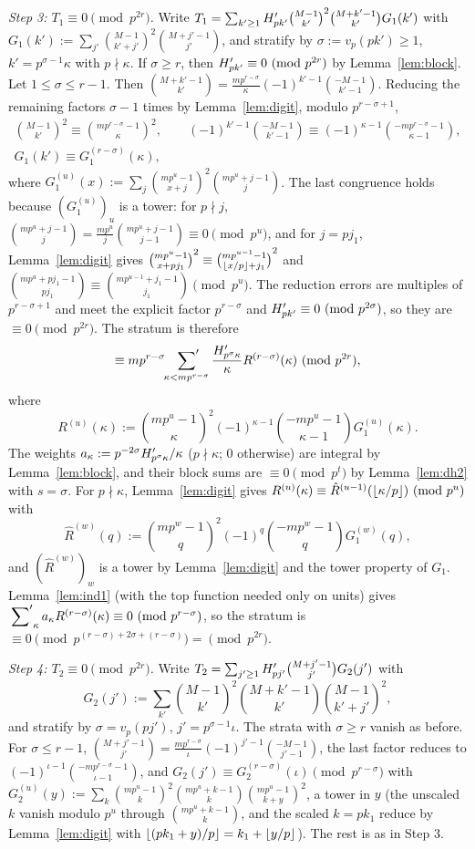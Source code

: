 \documentclass[11pt]{amsart}
\begin{document}
\emph{Step 3: $T_1\equiv0\pmod{p^{2r}}$.} Write $T_1=\sum_{k'\ge1}H'_{pk'}\binom{M-1}{k'}^2\binom{M+k'-1}{k'}G_1(k')$ with $G_1(k'):=\sum_{j'}\binom{M-1}{k'+j'}^2\binom{M+j'-1}{j'}$, and stratify by $\sigma:=v_p(pk')\ge1$, $k'=p^{\sigma-1}\kappa$ with $p\nmid\kappa$. If $\sigma\ge r$, then $H'_{pk'}\equiv0\ (\mathrm{mod}\ p^{2r})$ by Lemma~\ref{lem:block}. Let $1\le\sigma\le r-1$. Then $\binom{M+k'-1}{k'}=\frac{mp^{r-\sigma}}\kappa(-1)^{k'-1}\binom{-M-1}{k'-1}$. Reducing the remaining factors $\sigma-1$ times by Lemma~\ref{lem:digit}, modulo $p^{r-\sigma+1}$,
\begin{gather*} \binom{M-1}{k'}^2\equiv\binom{mp^{r-\sigma}-1}\kappa^2,\qquad(-1)^{k'-1}\binom{-M-1}{k'-1}\equiv(-1)^{\kappa-1}\binom{-mp^{r-\sigma}-1}{\kappa-1},\\ G_1(k')\equiv G_1^{(r-\sigma)}(\kappa), \end{gather*}
where $G_1^{(u)}(x):=\sum_j\binom{mp^u-1}{x+j}^2\binom{mp^u+j-1}j$. The last congruence holds because $(G_1^{(u)})_u$ is a tower: for $p\nmid j$, $\binom{mp^u+j-1}j=\frac{mp^u}j\binom{mp^u+j-1}{j-1}\equiv0\pmod{p^u}$, and for $j=pj_1$, Lemma~\ref{lem:digit} gives $\binom{mp^u-1}{x+pj_1}^2\equiv\binom{mp^{u-1}-1}{\left\lfloor x/p\right\rfloor+j_1}^2$ and $\binom{mp^u+pj_1-1}{pj_1}\equiv\binom{mp^{u-1}+j_1-1}{j_1}\pmod{p^u}$. The reduction errors are multiples of $p^{r-\sigma+1}$ and meet the explicit factor $p^{r-\sigma}$ and $H'_{pk'}\equiv0\ (\mathrm{mod}\ p^{2\sigma})$, so they are $\equiv0\pmod{p^{2r}}$. The stratum is therefore
\[ \equiv mp^{r-\sigma}\sideset{}{'}\sum_{\kappa<mp^{r-\sigma}}\frac{H'_{p^\sigma\kappa}}\kappa R^{(r-\sigma)}(\kappa)\ (\mathrm{mod}\ p^{2r}), \]
where
\[ R^{(u)}(\kappa):=\binom{mp^u-1}\kappa^2(-1)^{\kappa-1}\binom{-mp^u-1}{\kappa-1}G_1^{(u)}(\kappa). \]
The weights $a_\kappa:=p^{-2\sigma}H'_{p^\sigma\kappa}/\kappa$ ($p\nmid\kappa$; $0$ otherwise) are integral by Lemma~\ref{lem:block}, and their block sums are $\equiv0\pmod{p^t}$ by Lemma~\ref{lem:dh2} with $s=\sigma$. For $p\nmid\kappa$, Lemma~\ref{lem:digit} gives $R^{(u)}(\kappa)\equiv\hat R^{(u-1)}(\left\lfloor \kappa/p\right\rfloor)\ (\mathrm{mod}\ p^u)$ with
\[ \hat R^{(w)}(q):=\binom{mp^w-1}q^2(-1)^q\binom{-mp^w-1}qG_1^{(w)}(q), \]
and $(\hat R^{(w)})_w$ is a tower by Lemma~\ref{lem:digit} and the tower property of $G_1$. Lemma~\ref{lem:ind1} (with the top function needed only on units) gives $\sideset{}{'}\sum_\kappa a_\kappa R^{(r-\sigma)}(\kappa)\equiv0\ (\mathrm{mod}\ p^{r-\sigma})$, so the stratum is $\equiv0\pmod{p^{(r-\sigma)+2\sigma+(r-\sigma)}}=\pmod{p^{2r}}$.

\emph{Step 4: $T_2\equiv0\pmod{p^{2r}}$.} Write $T_2=\sum_{j'\ge1}H'_{pj'}\binom{M+j'-1}{j'}G_2(j')$ with
\[ G_2(j'):=\sum_{k'}\binom{M-1}{k'}^2\binom{M+k'-1}{k'}\binom{M-1}{k'+j'}^2, \]
and stratify by $\sigma=v_p(pj')$, $j'=p^{\sigma-1}\iota$. The strata with $\sigma\ge r$ vanish as before. For $\sigma\le r-1$, $\binom{M+j'-1}{j'}=\frac{mp^{r-\sigma}}\iota(-1)^{j'-1}\binom{-M-1}{j'-1}$, the last factor reduces to $(-1)^{\iota-1}\binom{-mp^{r-\sigma}-1}{\iota-1}$, and $G_2(j')\equiv G_2^{(r-\sigma)}(\iota)\pmod{p^{r-\sigma}}$ with $G_2^{(u)}(y):=\sum_k\binom{mp^u-1}k^2\binom{mp^u+k-1}k\binom{mp^u-1}{k+y}^2$, a tower in $y$ (the unscaled $k$ vanish modulo $p^u$ through $\binom{mp^u+k-1}k$, and the scaled $k=pk_1$ reduce by Lemma~\ref{lem:digit} with $\left\lfloor (pk_1+y)/p\right\rfloor=k_1+\left\lfloor y/p\right\rfloor$). The rest is as in Step 3.
\end{document}
